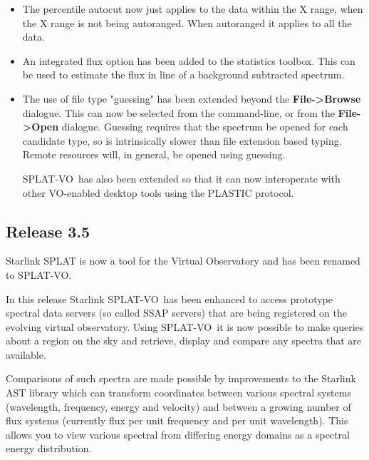 \documentclass[twoside,11pt]{article}
\renewcommand{\_}{\texttt{\symbol{95}}}
\newcommand{\SPLAT}{\textsf{SPLAT-VO}}
\newcommand{\labelitem}[1]{\textbf{#1}}
\begin{document}
\begin{itemize}
\item The percentile autocut now just applies to the data within the X 
range, when the X range is not being autoranged. When autoranged it
applies to all the data.

\item An integrated flux option has been added to the statistics toolbox.
This can be used to estimate the flux in line of a background subtracted
spectrum.

\item The use of file type "guessing" has been extended beyond the
\labelitem{File->Browse} dialogue. This can now be selected from the
command-line, or from the  
\labelitem{File->Open} dialogue. Guessing requires that the spectrum be opened
for each candidate type, so is intrinsically slower than file extension based 
typing. Remote resources will, in general, be opened using guessing.

\SPLAT\ has also been extended so that it can now interoperate with 
other VO-enabled desktop tools using the PLASTIC protocol.

\end{itemize}

\subsection{Release 3.5}

Starlink SPLAT is now a tool for the Virtual Observatory and has been renamed
to \SPLAT.

In this release Starlink \SPLAT\ has been enhanced to access prototype
spectral data servers (so called SSAP servers) that are being registered on
the evolving virtual observatory. Using \SPLAT\ it is now possible to make
queries about a region on the sky and retrieve, display and compare any
spectra that are available.

Comparisons of such spectra are made possible by improvements to the
Starlink AST library which can transform coordinates between various
spectral systems (wavelength, frequency, energy and velocity) and between a
growing number of flux systems (currently flux per unit frequency and per
unit wavelength). This allows you to view various spectral from differing
energy domains as a spectral energy distribution.
\end{document}
